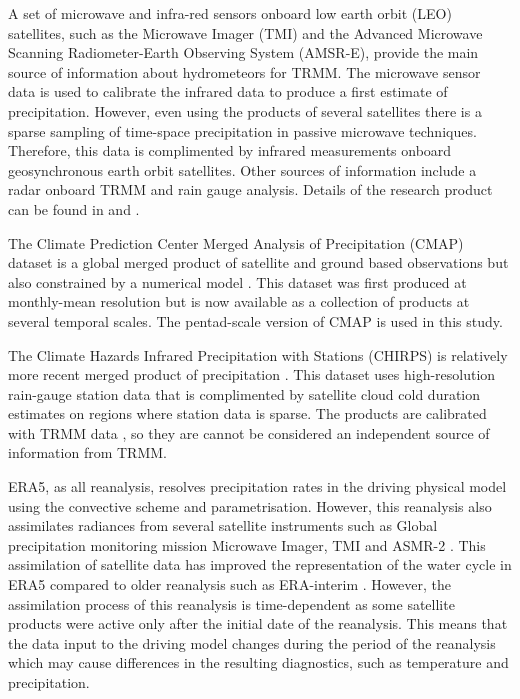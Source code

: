 A set of microwave and infra-red sensors onboard low earth orbit (LEO) satellites, such as the Microwave Imager (TMI) and the Advanced Microwave Scanning Radiometer-Earth Observing System (AMSR-E), provide the main source of information about hydrometeors for TRMM. The microwave sensor data is used to calibrate the infrared data to produce a first estimate of precipitation. However, even using the products of several satellites there is a sparse sampling of time-space precipitation  in passive microwave techniques. Therefore, this data is complimented by infrared measurements onboard geosynchronous earth orbit satellites. Other sources of information include a radar onboard TRMM and rain gauge analysis. Details of the research product can be found in \cite{huffman2007} and \cite{mission2011}.

The Climate Prediction Center Merged Analysis of Precipitation (CMAP) dataset is a global merged product of satellite and ground based observations but also constrained by a numerical model \citep{Xie2007}. This dataset was first produced at monthly-mean resolution \citep{xie1997} but is now available as a collection of products at several temporal scales. The pentad-scale version of CMAP is used in this study. %

The Climate Hazards Infrared Precipitation with Stations (CHIRPS) is relatively more recent merged product of precipitation \citep{funk2015}. This dataset uses high-resolution rain-gauge station data that is complimented by satellite cloud cold duration estimates on regions where station data is sparse. The products are calibrated with TRMM data \citep{funk2015}, so they are cannot be considered an independent source of information from TRMM.

ERA5, as all reanalysis, resolves precipitation rates in the driving physical model using the convective scheme and parametrisation. However, this reanalysis also assimilates radiances from several satellite instruments such as Global precipitation monitoring mission Microwave Imager, TMI and ASMR-2 \cite{era5hersbach}. This assimilation of satellite data has improved the representation of the water cycle in ERA5 compared to older reanalysis such as ERA-interim \citep[e.g.][]{henin2018assessing}. However, the assimilation process of this reanalysis is time-dependent as some satellite products were active only after the initial date of the reanalysis. This means that the data input to the driving model changes during the period of the reanalysis which may cause differences in the resulting diagnostics, such as temperature and precipitation.


